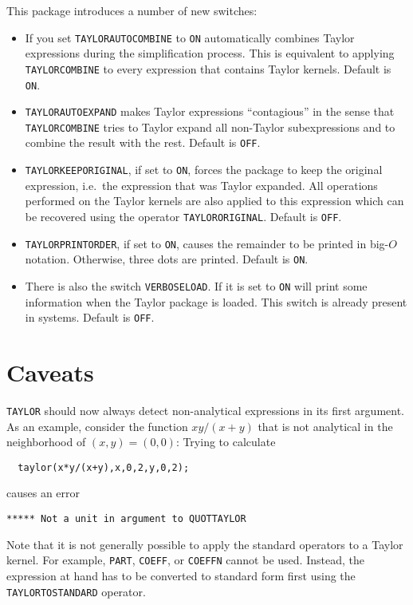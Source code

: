 This package introduces a number of new switches:
\begin{itemize}

\item If you set \verb|TAYLORAUTOCOMBINE| to \verb|ON| \REDUCE{}
    automatically combines Taylor expressions during the simplification
    process.  This is equivalent to applying \verb|TAYLORCOMBINE| to
    every expression that contains Taylor kernels.
    Default is \verb|ON|.

\item \verb|TAYLORAUTOEXPAND| makes Taylor expressions ``contagious''
    in the sense that \verb|TAYLORCOMBINE| tries to Taylor expand
    all non-Taylor subexpressions and to combine the result with the
    rest. Default is \verb|OFF|.

\item \verb|TAYLORKEEPORIGINAL|, if set to \verb|ON|, forces the
    package to keep the original expression, i.e.\ the expression
    that was Taylor expanded.  All operations performed on the
    Taylor kernels are also applied to this expression  which can
    be recovered using the operator \verb|TAYLORORIGINAL|.
    Default is \verb|OFF|.

\item \verb|TAYLORPRINTORDER|, if set to \verb|ON|, causes the
    remainder to be printed in big-$O$ notation.  Otherwise, three
    dots are printed. Default is \verb|ON|.

\item There is also the switch \verb|VERBOSELOAD|.  If it is set to
    \verb|ON|
    \REDUCE{} will print some information when the Taylor package is
    loaded.  This switch is already present in \PSL{} systems.
    Default is \verb|OFF|.

\end{itemize}

\section{Caveats}

\verb|TAYLOR| should now always detect non-analytical expressions in
its first argument. As an example, consider the function $xy/(x+y)$
that is not analytical in the neighborhood of $(x,y) = (0,0)$: Trying
to calculate
\begin{verbatim}
  taylor(x*y/(x+y),x,0,2,y,0,2);
\end{verbatim}
causes an error
\begin{verbatim}
***** Not a unit in argument to QUOTTAYLOR
\end{verbatim}
Note that it is not generally possible to apply the standard \REDUCE{}
operators to a Taylor kernel. For example, \verb|PART|, \verb|COEFF|,
or \verb|COEFFN| cannot be used. Instead, the expression at hand has
to be converted to standard form first using the \verb|TAYLORTOSTANDARD|
operator.

